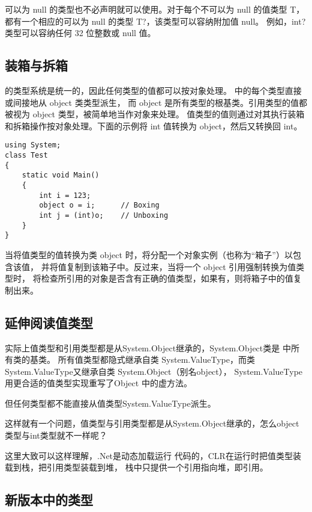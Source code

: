 可以为 null 的类型也不必声明就可以使用。对于每个不可以为 null 的值类型 T，
都有一个相应的可以为 null 的类型 T?，该类型可以容纳附加值 null。
例如，int? 类型可以容纳任何 32 位整数或 null 值。

\subsection{装箱与拆箱}
 \cs  的类型系统是统一的，因此任何类型的值都可以按对象处理。 \cs  中的每个类型直接或间接地从 object 类类型派生，
而 object 是所有类型的根基类。引用类型的值都被视为 object 类型，被简单地当作对象来处理。
值类型的值则通过对其执行装箱和拆箱操作按对象处理。下面的示例将 int 值转换为 object，然后又转换回 int。

\begin{lstlisting}
using System;
class Test
{
    static void Main()
    {
        int i = 123;
        object o = i;      // Boxing
        int j = (int)o;    // Unboxing
    }
}
\end{lstlisting}

当将值类型的值转换为类 object 时，将分配一个对象实例（也称为“箱子”）以包含该值，
并将值复制到该箱子中。反过来，当将一个 object 引用强制转换为值类型时，
将检查所引用的对象是否含有正确的值类型，如果有，则将箱子中的值复制出来。


\subsection{延伸阅读值类型}

实际上值类型和引用类型都是从System.Object继承的，System.Object类是 \cs 中所有类的基类。
所有值类型都隐式继承自类 System.ValueType，而类System.ValueType又继承自类 System.Object（别名object），
System.ValueType 用更合适的值类型实现重写了Object 中的虚方法。 

但任何类型都不能直接从值类型System.ValueType派生。

这样就有一个问题，值类型与引用类型都是从System.Object继承的，怎么object类型与int类型就不一样呢？

这里大致可以这样理解，.Net是动态加载运行 \cs 代码的，CLR在运行时把值类型装载到栈，把引用类型装载到堆，
栈中只提供一个引用指向堆，即引用。

\subsection{\cs 新版本中的类型}


